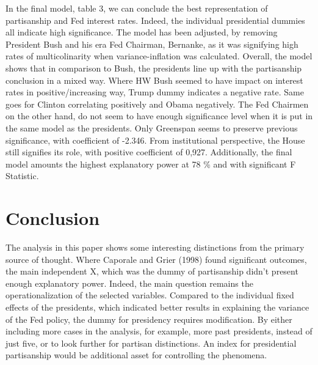 \documentclass[11pt]{article}
\begin{document}
In the final model, table 3, we can conclude the best representation of partisanship and Fed interest rates. Indeed, the individual presidential dummies all indicate high significance. The model has been adjusted, by removing President Bush and his era Fed Chairman, Bernanke, as it was signifying high rates of multicolinarity when variance-inflation was calculated. Overall, the model shows that in comparison to Bush, the presidents line up with the partisanship conclusion in a mixed way. Where HW Bush seemed to have impact on interest rates in positive/increasing way, Trump dummy indicates a negative rate. Same goes for Clinton correlating positively and Obama negatively. The Fed Chairmen on the other hand, do not seem to have enough significance level when it is put in the same model as the presidents. Only Greenspan seems to preserve previous significance, with coefficient of -2.346. 
From institutional perspective, the House still signifies its role, with positive coefficient of 0,927. Additionally, the final model amounts the highest explanatory power at 78 \% and with significant F Statistic.
 
\section{Conclusion}

The analysis in this paper shows some interesting distinctions from the primary source of thought. Where Caporale and Grier (1998) found significant outcomes, the main independent X, which was the dummy of partisanship didn’t present enough explanatory power. Indeed, the main question remains the operationalization of the selected variables. Compared to the individual fixed effects of the presidents, which indicated better results in explaining the variance of the Fed policy, the dummy for presidency requires modification. By either including more cases in the analysis, for example, more past presidents, instead of just five, or to look further for partisan distinctions. An index for presidential partisanship would be additional asset for controlling the phenomena. \
\end{document}
